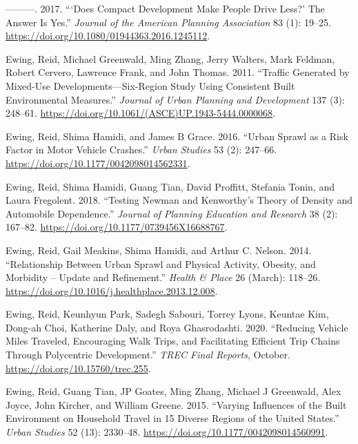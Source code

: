 \documentclass[
  11pt,
  openany]{memoir}
\newlength{\cslhangindent}
\newlength{\cslentryspacingunit} %
\newenvironment{CSLReferences}[2] %
 {%
  \setlength{\parindent}{0pt}
  \ifodd #1
  \let\oldpar\par
  \def\par{\hangindent=\cslhangindent\oldpar}
  \fi
  \setlength{\parskip}{#2\cslentryspacingunit}
 }%
 {}
\begin{document}
\begin{CSLReferences}{1}{0}
\leavevmode{}%
---------. 2017. {``{`{Does Compact Development Make People Drive Less}?'} {The Answer Is Yes}.''} \emph{Journal of the American Planning Association} 83 (1): 19--25. \url{https://doi.org/10.1080/01944363.2016.1245112}.

\leavevmode{}%
Ewing, Reid, Michael Greenwald, Ming Zhang, Jerry Walters, Mark Feldman, Robert Cervero, Lawrence Frank, and John Thomas. 2011. {``Traffic {Generated} by {Mixed}-{Use Developments}---{Six}-{Region Study Using Consistent Built Environmental Measures}.''} \emph{Journal of Urban Planning and Development} 137 (3): 248--61. \url{https://doi.org/10.1061/(ASCE)UP.1943-5444.0000068}.

\leavevmode{}%
Ewing, Reid, Shima Hamidi, and James B Grace. 2016. {``Urban Sprawl as a Risk Factor in Motor Vehicle Crashes.''} \emph{Urban Studies} 53 (2): 247--66. \url{https://doi.org/10.1177/0042098014562331}.

\leavevmode{}%
Ewing, Reid, Shima Hamidi, Guang Tian, David Proffitt, Stefania Tonin, and Laura Fregolent. 2018. {``Testing {Newman} and {Kenworthy}'s {Theory} of {Density} and {Automobile Dependence}.''} \emph{Journal of Planning Education and Research} 38 (2): 167--82. \url{https://doi.org/10.1177/0739456X16688767}.

\leavevmode{}%
Ewing, Reid, Gail Meakins, Shima Hamidi, and Arthur C. Nelson. 2014. {``Relationship Between Urban Sprawl and Physical Activity, Obesity, and Morbidity -- {Update} and Refinement.''} \emph{Health \& Place} 26 (March): 118--26. \url{https://doi.org/10.1016/j.healthplace.2013.12.008}.

\leavevmode{}%
Ewing, Reid, Keunhyun Park, Sadegh Sabouri, Torrey Lyons, Keuntae Kim, Dong-ah Choi, Katherine Daly, and Roya Ghasrodashti. 2020. {``Reducing {Vehicle Miles Traveled}, {Encouraging Walk Trips}, and {Facilitating Efficient Trip Chains Through Polycentric Development}.''} \emph{TREC Final Reports}, October. \url{https://doi.org/10.15760/trec.255}.

\leavevmode{}%
Ewing, Reid, Guang Tian, JP Goates, Ming Zhang, Michael J Greenwald, Alex Joyce, John Kircher, and William Greene. 2015. {``Varying Influences of the Built Environment on Household Travel in 15 Diverse Regions of the {United States}.''} \emph{Urban Studies} 52 (13): 2330--48. \url{https://doi.org/10.1177/0042098014560991}.


\end{CSLReferences}
\end{document}
